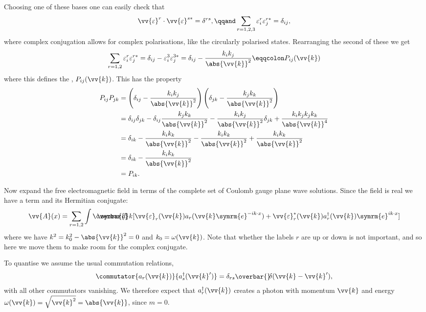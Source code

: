 \documentclass[fleqn]{NotesClass}
\newcommand{\e}{\symrm{e}}
\newcommand{\hermit}{{\dagger}}
\newcommand{\dbar}[1][0.0]{\ThisStyle{\ensurestackMath{%
            \stackengine{#1\LMex}{\SavedStyle \symrm{d}}{\SavedStyle\overbar{}%
                \mkern2.25mu}{O}{r}{F}{F}{L}}}}
\newcommand{\invariantmeasure}[1]{%
    \mathchoice{\dbar #1}{\dbar #1}{\dbar[.05] #1}{\dbar[.06] #1}
}
\newcommand\bardelta{\ThisStyle{\ensurestackMath{%
            \stackengine{-.3\LMpt}{\SavedStyle \delta}{\SavedStyle\overbar{}%
                \mkern4.5mu}{O}{r}{F}{F}{L}}}}
\begin{document}
    
    Choosing one of these bases one can easily check that
    \begin{equation}
        \vv{\varepsilon}^r \cdot \vv{\varepsilon}^{s*} = \delta^{rs}, \qqand \sum_{r=1,2,3} \varepsilon_i^r\varepsilon_j^{r*} = \delta_{ij},
    \end{equation}
    where complex conjugation allows for complex polarisations, like the circularly polarised states.
    Rearranging the second of these we get
    \begin{equation}
        \sum_{r=1,2} \varepsilon_i^r \varepsilon_j^{r*} = \delta_{ij} - \varepsilon_i^3\varepsilon_j^{3*} = \delta_{ij} - \frac{k_ik_j}{\abs{\vv{k}}^2} \eqqcolon P_{ij}(\vv{k})
    \end{equation}
    where this defines the , \(P_{ij}(\vv{k})\).
    This has the property
    \begin{align}
        P_{ij}P_{jk} &= \left( \delta_{ij} - \frac{k_ik_j}{\abs{\vv{k}}^2} \right)\left( \delta_{jk} - \frac{k_jk_k}{\abs{\vv{k}}^2} \right)\\
        &= \delta_{ij}\delta_{jk} - \delta_{ij}\frac{k_jk_k}{\abs{\vv{k}}^2} - \frac{k_ik_j}{\abs{\vv{k}}^2}\delta_{jk} + \frac{k_ik_jk_jk_k}{\abs{\vv{k}}^4}\\
        &= \delta_{ik} - \frac{k_ik_k}{\abs{\vv{k}}^2} - \frac{k_ik_k}{\abs{\vv{k}}^2} + \frac{k_ik_k}{\abs{\vv{k}}^2}\\
        &= \delta_{ik} - \frac{k_ik_k}{\abs{\vv{k}}^2}\\
        &= P_{ik}.
    \end{align}
    
    Now expand the free electromagnetic field in terms of the complete set of Coulomb gauge plane wave solutions.
    Since the field is real we have a term and its Hermitian conjugate:
    \begin{equation}
        \vv{A}(x) = \sum_{r = 1, 2} \int \invariantmeasure{k} [\vv{\varepsilon}_r(\vv{k}) a_r(\vv{k} \e^{-ik\cdot x}) + \vv{\varepsilon}_r^*(\vv{k}) a_r^\hermit(\vv{k})\e^{ik\cdot x}]
    \end{equation}
    where we have \(k^2 = k_0^2 - \abs{\vv{k}}^2 = 0\) and \(k_0 = \omega(\vv{k})\).
    Note that whether the labels \(r\) are up or down is not important, and so here we move them to make room for the complex conjugate.
    
    To quantise we assume the usual commutation relations,
    \begin{equation}
        \commutator{a_r(\vv{k})}{a_s^\hermit(\vv{k}')} = \delta_{rs} \bardelta(\vv{k} - \vv{k}'),
    \end{equation}
    with all other commutators vanishing.
    We therefore expect that \(a_r^\hermit(\vv{k})\) creates a photon with momentum \(\vv{k}\) and energy \(\omega(\vv{k}) = \sqrt{\vv{k}^2} = \abs{\vv{k}}\), since \(m = 0\).
    
\end{document}
